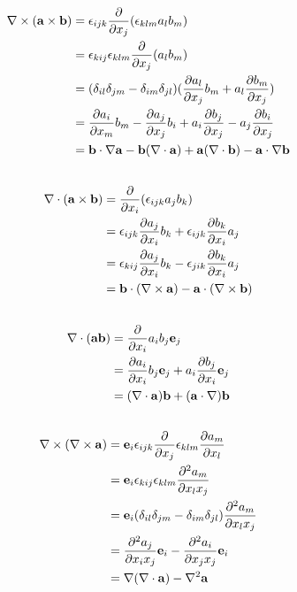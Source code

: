 \documentclass[12pt]{article}
\newcommand{\bb}{{\bf b}}
\newcommand{\ba}{{\bf a}}
\newcommand{\ee}{{\bf e}}
\newcommand{\bnabla}{{\bf \nabla}}
\newcommand{\pr}{{\partial}}
\begin{document}
\subsection{}
\begin{align*}
\bnabla\times(\ba\times\bb)&= \epsilon_{ijk} \frac{\pr}{\pr x_j} (\epsilon_{klm}a_lb_m)\\
	&=\epsilon_{kij}\epsilon_{klm} \frac{\pr}{\pr x_j} (a_lb_m)\\
	&= (\delta_{il}\delta_{jm} - \delta_{im}\delta_{jl}) (\frac{\pr a_l}{\pr x_j}b_m + a_l\frac{\pr b_m}{\pr x_j})\\
	&= \frac{\pr a_i}{\pr x_m}b_m  - \frac{\pr a_j}{\pr x_j}b_i + a_i\frac{\pr b_j}{\pr x_j} - a_j\frac{\pr b_i}{\pr x_j}\\
	&= \bb\cdot\bnabla\ba - \bb(\bnabla\cdot\ba) +  \ba(\bnabla\cdot\bb) - \ba\cdot\bnabla\bb
\end{align*}

\subsection{}
\begin{align*}
\bnabla\cdot(\ba\times\bb) &= \frac{\pr}{\pr x_i}(\epsilon_{ijk} a_jb_k)\\
		&= \epsilon_{ijk}  \frac{\pr a_j}{\pr x_i} b_k +  \epsilon_{ijk}  \frac{\pr b_k}{\pr x_i} a_j\\
		&= \epsilon_{kij}  \frac{\pr a_j}{\pr x_i} b_k -  \epsilon_{jik}  \frac{\pr b_k}{\pr x_i} a_j\\
		&= \bb\cdot(\bnabla\times\ba)  - \ba\cdot(\bnabla\times\bb)
\end{align*}


\subsection{}
\begin{align*}
\nabla\cdot(\ba\bb) &= \frac{\pr}{\pr x_i}a_ib_j \ee_j\\
	&= \frac{\pr a_i}{\pr x_i}b_j \ee_j +  a_i\frac{\pr b_j}{\pr x_i}\ee_j\\
	&= (\bnabla\cdot\ba)\bb + (\ba\cdot\bnabla)\bb
\end{align*}


\subsection{}
\begin{align*}
\bnabla\times(\bnabla\times\ba) &= \ee_i\epsilon_{ijk}\frac{\pr}{\pr x_j}\epsilon_{klm}\frac{\pr a_m}{\pr x_l}\\
&= \ee_i\epsilon_{kij}\epsilon_{klm}\frac{\pr^2 a_m}{\pr x_lx_j}\\
&= \ee_i(\delta_{il}\delta_{jm} - \delta_{im}\delta_{jl})\frac{\pr^2 a_m}{\pr x_lx_j}\\
&= \frac{\pr^2 a_j}{\pr x_ix_j}\ee_i - \frac{\pr^2 a_i}{\pr x_jx_j}\ee_i\\
&= \bnabla(\bnabla\cdot\ba) - \nabla^2\ba
\end{align*}
\end{document}

